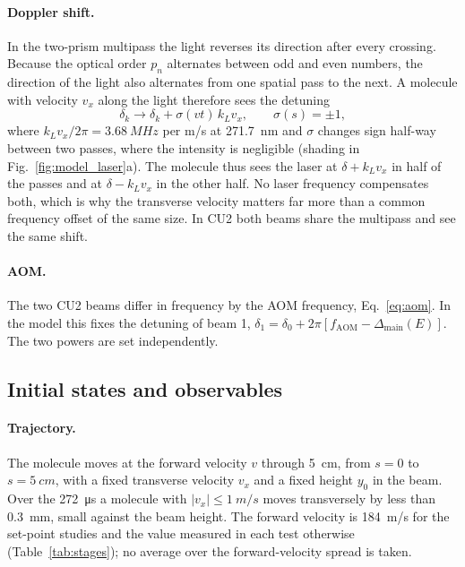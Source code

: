 \documentclass[11pt,a4paper,oneside]{report}
\newcommand{\fAOM}{f_{\mathrm{AOM}}}
\newcommand{\Dmain}{\Delta_{\mathrm{main}}}
\begin{document}
\paragraph{Doppler shift.} In the two-prism multipass the light reverses its direction after every
crossing. Because the optical order $p_n$ alternates between odd and even numbers, the direction of
the light also alternates from one spatial pass to the next. A molecule with velocity $v_x$ along
the light therefore sees the detuning
\begin{equation}
  \delta_k\to\delta_k+\sigma(vt)\,k_Lv_x,\qquad \sigma(s)=\pm1,
  \label{eq:doppler}
\end{equation}
where $k_Lv_x/2\pi=\SI{3.68}{MHz}$ per m/s at \SI{271.7}{nm} and $\sigma$ changes sign half-way
between two passes, where the intensity is negligible (shading in Fig.~\ref{fig:model_laser}a). The
molecule thus sees the laser at $\delta+k_Lv_x$ in half of the passes and at $\delta-k_Lv_x$ in the
other half. No laser frequency compensates both, which is why the transverse velocity matters far
more than a common frequency offset of the same size. In CU2 both beams share the multipass and see
the same shift.

\paragraph{AOM.} The two CU2 beams differ in frequency by the AOM frequency, Eq.~\eqref{eq:aom}. In
the model this fixes the detuning of beam 1, $\delta_1=\delta_0+2\pi[\fAOM-\Dmain(E)]$. The two powers
are set independently.

\subsection{Initial states and observables}
\label{sec:model_obs}

\paragraph{Trajectory.} The molecule moves at the forward velocity $v$ through \SI{5}{cm}, from
$s=0$ to $s=\SI{5}{cm}$, with a fixed transverse velocity $v_x$ and a fixed height $y_0$ in the beam.
Over the \SI{272}{\micro s} a molecule with $|v_x|\leq\SI{1}{m/s}$ moves transversely by less than
\SI{0.3}{mm}, small against the beam height. The forward velocity is \SI{184}{m/s} for the set-point
studies and the value measured in each test otherwise (Table~\ref{tab:stages}); no average over the
forward-velocity spread is taken.
\end{document}
